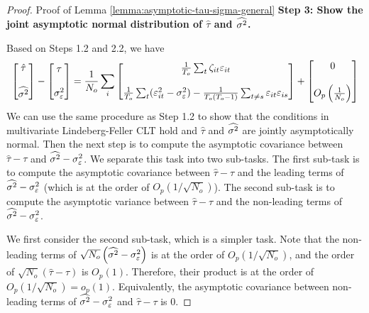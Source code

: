 \begin{proof}{Proof of Lemma \ref{lemma:asymptotic-tau-sigma-general}}
\textbf{Step 3: Show the joint asymptotic normal distribution of $\hat{\tau}$ and $\widehat{\sigma^2}$.}

Based on Steps 1.2 and 2.2, we have 
\begin{align*}
    \begin{bmatrix}
        \hat{\tau} \\ \\ \widehat{\sigma^2} 
    \end{bmatrix} - \begin{bmatrix}
       \tau \\ \\ \sigma_\varepsilon^2 
    \end{bmatrix} = \frac{1}{N_o} \sum_i \begin{bmatrix}
        \frac{1}{T_o}\sum_{t} \zeta_{it} \varepsilon_{it} \\ \\
        \frac{1}{T_o} \sum_t (\varepsilon_{it}^2 - \sigma_\varepsilon^2 )  - \frac{1}{T_o (T_o-1)} \sum_{t\neq s} \varepsilon_{it} \varepsilon_{is}
    \end{bmatrix} + \begin{bmatrix}
        0 \\  \\ O_p\left( \frac{1}{N_o} \right) 
    \end{bmatrix}
\end{align*}
We can use the same procedure as Step 1.2 to show that the conditions in multivariate Lindeberg-Feller CLT hold and $\hat{\tau}$ and $\widehat{\sigma^2}$ are jointly asymptotically normal. Then the next step is to compute the asymptotic covariance between $\hat{\tau} - \tau$ and $\widehat{\sigma^2} - \sigma^2_\varepsilon$. We separate this task into two sub-tasks. The first sub-task is to compute the asymptotic covariance between $\hat{\tau} - \tau$ and the leading terms of $\widehat{\sigma^2} - \sigma^2_\varepsilon$ (which is at the order of $O_p\left(1/\sqrt{N_o}\right)$). The second sub-task is to compute the asymptotic variance between $\hat{\tau} - \tau$ and the non-leading terms of $\widehat{\sigma^2} - \sigma^2_\varepsilon$. 

We first consider the second sub-task, which is a simpler task. Note that  the non-leading terms of $\sqrt{N_o} \left(\widehat{\sigma^2} - \sigma^2_\varepsilon\right)$ is at the order of $O_p\left(1/\sqrt{N_o}\right)$, and the order of $\sqrt{N_o}(\hat{\tau} - \tau)$ is $O_p(1)$. Therefore, their product is at the order of $O_p\left(1/\sqrt{N_o}\right) = o_p(1)$. Equivalently, the asymptotic covariance between non-leading terms of $\widehat{\sigma^2} - \sigma^2_\varepsilon$ and $\hat{\tau} - \tau$ is $0$. 


\end{proof}
